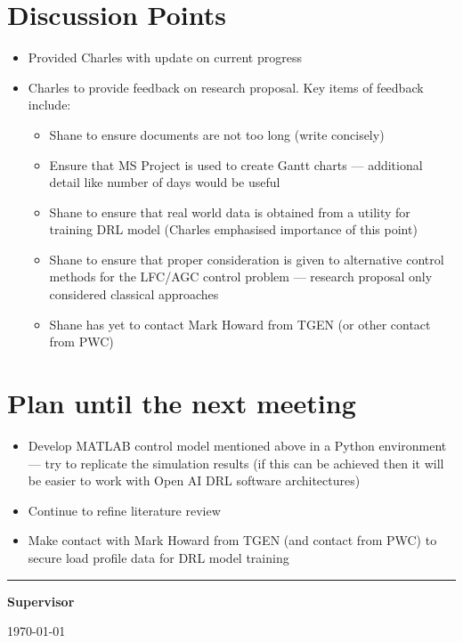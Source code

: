 \documentclass[12pt]{article}
\begin{document}
	\section{Discussion Points}
	\begin{itemize}
		\item Provided Charles with update on current progress
		\item Charles to provide feedback on research proposal. Key items of feedback include:
		\begin{itemize}
			\item Shane to ensure documents are not too long (write concisely)
			\item Ensure that MS Project is used to create Gantt charts --- additional detail like number of days would be useful
			\item Shane to ensure that real world data is obtained from a utility for training DRL model (Charles emphasised importance of this point)
			\item  Shane to ensure that proper consideration is given to alternative control methods for the LFC/AGC control problem --- research proposal only considered classical approaches
			\item Shane has yet to contact Mark Howard from TGEN (or other contact from PWC)
		\end{itemize} 
	\end{itemize}
	
	\section{Plan until the next meeting}
	\begin{itemize}
		\item Develop MATLAB control model mentioned above in a Python environment --- try to replicate the simulation results (if this can be achieved then it will be easier to work with Open AI DRL software architectures)
		\item Continue to refine literature review
		\item Make contact with Mark Howard from TGEN (and contact from PWC) to secure load profile data for DRL model training
	\end{itemize}
	
	\par
	\vspace{\fill}%
	\noindent\rule{0.4\linewidth}{0.5pt}%
	\vspace{1em}%
	\par
	\noindent\textbf{Supervisor}\vspace{1em}%
	\par
	\noindent\today
\end{document}
